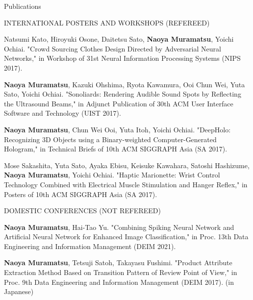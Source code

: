 \documentclass{resume} %
\begin{document}
\begin{rSection}{Publications}
    \begin{rSubsection}{INTERNATIONAL POSTERS AND WORKSHOPS (REFEREED)}{}{}{}{}
        \item Natsumi Kato, Hiroyuki Osone, Daitetsu Sato, \textbf{Naoya Muramatsu}, Yoichi Ochiai. "Crowd Sourcing Clothes Design Directed by Adversarial Neural Networks," in Workshop of 31st Neural Information Processing Systems (NIPS 2017).
        \item \textbf{Naoya Muramatsu}, Kazuki Ohshima, Ryota Kawamura, Ooi Chun Wei, Yuta Sato, Yoichi Ochiai. "Sonoliards: Rendering Audible Sound Spots by Reflecting the Ultrasound Beams," in Adjunct Publication of 30th ACM User Interface Software and Technology (UIST 2017).
        \item \textbf{Naoya Muramatsu}, Chun Wei Ooi, Yuta Itoh, Yoichi Ochiai. "DeepHolo: Recognizing 3D Objects using a Binary-weighted Computer-Generated Hologram," in Technical Briefs of 10th ACM SIGGRAPH Asia (SA 2017).
        \item Mose Sakashita, Yuta Sato, Ayaka Ebisu, Keisuke Kawahara, Satoshi Hashizume, \textbf{Naoya Muramatsu}, Yoichi Ochiai. "Haptic Marionette: Wrist Control Technology Combined with Electrical Muscle Stimulation and Hanger Reflex," in Posters of 10th ACM SIGGRAPH Asia (SA 2017).
    \end{rSubsection}



    \begin{rSubsection}{DOMESTIC CONFERENCES (NOT REFEREED)}{}{}{}{}
        \item \textbf{Naoya Muramatsu}, Hai-Tao Yu. "Combining Spiking Neural Network and Artificial Neural Network for Enhanced Image Classification," in Proc. 13th Data Engineering and Information Management (DEIM 2021).
        \item \textbf{Naoya Muramatsu}, Tetsuji Satoh, Takayasu Fushimi. "Product Attribute Extraction Method Based on Transition Pattern of Review Point of View," in Proc. 9th Data Engineering and Information Management (DEIM 2017). (in Japanese) %
    \end{rSubsection}

\end{rSection}
\end{document}
